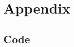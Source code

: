 \documentclass[12pt]{article}
\begin{document}
\section{Appendix}

\subsection{Code}

\begin{verbatim}

\end{verbatim}




\end{document}
